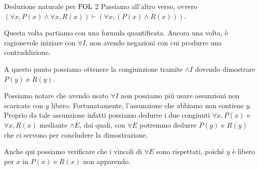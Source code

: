   \begin{example}{Deduzione naturale per \(\FOL\) 2}
  Passiamo all'altro verso, ovvero \((\forall x, P(x) \land \forall x, R(x))\vdash (\forall x, (P(x) \land R(x)))\).

  Questa volta partiamo con una formula quantificata. Ancora una volta, è ragionevole iniziare con \(\forall I\), non avendo negazioni con cui produrre una contraddizione.

  \begin{prooftree}
  \end{prooftree}

  A questo punto possiamo ottenere la congiunzione tramite \(\land I\) dovendo dimostrare \(P(y)\) e \(R(y)\).
  
  \begin{prooftree}
  \end{prooftree}

  Possiamo notare che avendo usato \(\forall I\) non possiamo più usare assunzioni non scaricate con \(y\) libero. Fortunatamente, l'assunzione che abbiamo non contiene \(y\). Proprio da tale assunzione infatti possiamo dedurre i due congiunti \(\forall x, P(x)\) e \(\forall x, R(x)\) mediante \(\land E\), dai quali, con \(\forall E\) potremmo dedurre \(P(y)\) e \(R(y)\) che ci servono per concludere la dimostrazione.

  \begin{prooftree}
      
  \end{prooftree}

  Anche qui possiamo verificare che i vincoli di \(\forall E\) sono rispettati, poiché \(y\) è libero per \(x\) in \(P(x)\) e \(R(x)\) non apparendo.
\end{example}

